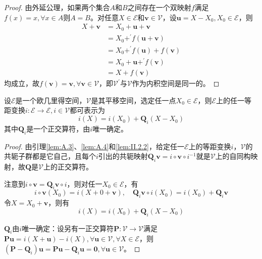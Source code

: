 \documentclass[main.tex]{subfiles}
\begin{document}
\begin{proof}
    由外延公理，如果两个集合$A$和$B$之间存在一个双映射$f$满足$f\left(x\right)=x,\forall x\in A$则$A=B$。对任意$X\in\mathcal{E}$和$\mathbf{v}\in\mathcal{V}$，设$\mathbf{u}=X-X_0,X_0\in\mathcal{E}$，则
    \begin{align*}
        X+\mathbf{v} & =X_0+\mathbf{u}+\mathbf{v}                                     \\
                     & =X_0+^\prime f\left(\mathbf{u}+\mathbf{v}\right)               \\
                     & =X_0+^\prime f\left(\mathbf{u}\right)+f\left(\mathbf{v}\right) \\
                     & =X_0+\mathbf{u}+^\prime f\left(\mathbf{v}\right)               \\
                     & =X+f\left(\mathbf{v}\right)
    \end{align*}
    均成立，故$f\left(\mathbf{v}\right)=\mathbf{v},\forall\mathbf{v}\in\mathcal{V}$，即$\mathcal{V}^\prime$与$\mathcal{V}$作为内积空间是同一的。
\end{proof}

\begin{theorem*}
    设$\mathcal{E}$是一个欧几里得空间，$\mathcal{V}$是其平移空间，选定任一点$X_0\in\mathcal{E}$，则$\mathcal{E}$上的任一等距变换$i:\mathcal{E}\rightarrow\mathcal{E},i\in\mathcal{V}$都可表示为
    \[
        i\left(X\right)=i\left(X_0\right)+\mathbf{Q}_i\left(X-X_0\right)
    \]
    其中$\mathbf{Q}_i$是一个正交算符，由$i$唯一确定。
\end{theorem*}
\begin{proof}
    由引理\ref{lem:A.3}、\ref{lem:A.4}和\ref{lem:II.2.2}，给定任一$\mathcal{E}$上的等距变换$i$，$\mathcal{V}$的共轭子群都是它自己，且每个$i$引出的共轭映射$\mathbf{Q}_i\mathbf{v}=i\circ\mathbf{v}\circ i^{-1}$就是$\mathcal{V}$上的自同构映射，故$\mathbf{Q}$是$\mathcal{V}$上的正交算符。

    注意到$i\circ\mathbf{v}=\mathbf{Q}_i\mathbf{v}\circ i$，则对任一$X_0\in\mathcal{E}$，有
    \[i\circ \mathbf{v}\left(X_0\right)=i\left(X+0+\mathbf{v}\right),\quad \mathbf{Q}_i\mathbf{v}\circ i\left(X_0\right)=i\left(X_0\right)+\mathbf{Q}_i\mathbf{v}\]
    令$X=X_0+\mathbf{v}$，则有
    \[
        i\left(X\right)=i\left(X_0\right)+\mathbf{Q}_i\left(X-X_0\right)
    \]

    $\mathbf{Q}_i$由$i$唯一确定：设另有一正交算符$\mathbf{P}:\mathcal{V}\rightarrow\mathcal{V}$满足$\mathbf{Pu}=i\left(X+\mathbf{u}\right)-i\left(X\right),\forall\mathbf{u}\in\mathcal{V},\forall X\in\mathcal{E}$，则$\left(\mathbf{P}-\mathbf{Q}_i\right)\mathbf{u}=\mathbf{Pu}-\mathbf{Q}_i\mathbf{u}=\mathbf{0},\forall\mathbf{u}\in\mathcal{V}$。
\end{proof}
\end{document}
